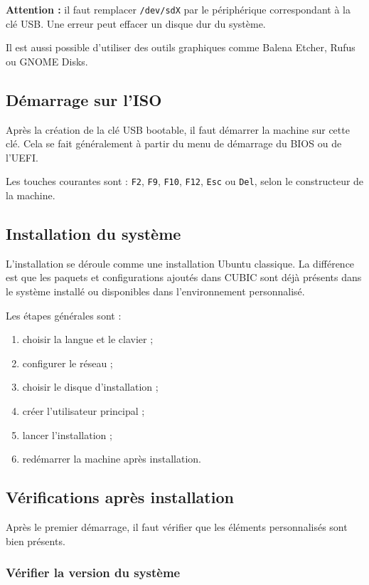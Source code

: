 \documentclass[12pt,a4paper]{article}
\begin{document}
\textbf{Attention :} il faut remplacer \texttt{/dev/sdX} par le périphérique correspondant à la clé USB. Une erreur peut effacer un disque dur du système.

Il est aussi possible d'utiliser des outils graphiques comme Balena Etcher, Rufus ou GNOME Disks.

\subsection{Démarrage sur l'ISO}

Après la création de la clé USB bootable, il faut démarrer la machine sur cette clé. Cela se fait généralement à partir du menu de démarrage du BIOS ou de l'UEFI.

Les touches courantes sont : \texttt{F2}, \texttt{F9}, \texttt{F10}, \texttt{F12}, \texttt{Esc} ou \texttt{Del}, selon le constructeur de la machine.

\subsection{Installation du système}

L'installation se déroule comme une installation Ubuntu classique. La différence est que les paquets et configurations ajoutés dans CUBIC sont déjà présents dans le système installé ou disponibles dans l'environnement personnalisé.

Les étapes générales sont :

\begin{enumerate}
    \item choisir la langue et le clavier ;
    \item configurer le réseau ;
    \item choisir le disque d'installation ;
    \item créer l'utilisateur principal ;
    \item lancer l'installation ;
    \item redémarrer la machine après installation.
\end{enumerate}

\subsection{Vérifications après installation}

Après le premier démarrage, il faut vérifier que les éléments personnalisés sont bien présents.

\subsubsection*{Vérifier la version du système}
\end{document}
